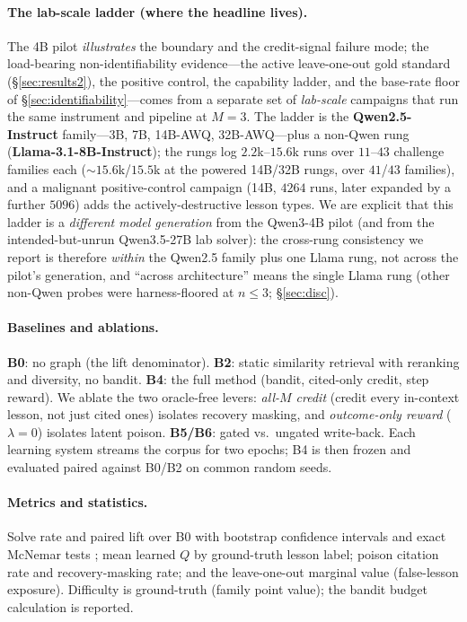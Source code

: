 \documentclass[10pt,twocolumn]{article}
\begin{document}
\paragraph{The lab-scale ladder (where the headline lives).} The 4B pilot
\emph{illustrates} the boundary and the credit-signal failure mode; the load-bearing
non-identifiability evidence---the active leave-one-out gold standard (\S\ref{sec:results2}),
the positive control, the capability ladder, and the base-rate floor of
\S\ref{sec:identifiability}---comes from a separate set of \emph{lab-scale} campaigns that
run the same instrument and pipeline at $M{=}3$. The ladder is the \textbf{Qwen2.5-Instruct}
family---3B, 7B, 14B-AWQ, 32B-AWQ---plus a non-Qwen rung
(\textbf{Llama-3.1-8B-Instruct}); the rungs log $2.2$k--$15.6$k runs over $11$--$43$
challenge families each (${\sim}15.6$k/$15.5$k at the powered 14B/32B rungs, over $41$/$43$
families), and a malignant positive-control campaign (14B, $4264$ runs, later expanded by a
further $5096$) adds the actively-destructive lesson types. We are explicit that this ladder is a \emph{different
model generation} from the Qwen3-4B pilot (and from the intended-but-unrun Qwen3.5-27B lab
solver): the cross-rung consistency we report is therefore \emph{within} the Qwen2.5 family
plus one Llama rung, not across the pilot's generation, and ``across architecture'' means
the single Llama rung (other non-Qwen probes were harness-floored at $n\le3$;
\S\ref{sec:disc}).

\paragraph{Baselines and ablations.} \textbf{B0}: no graph (the lift denominator).
\textbf{B2}: static similarity retrieval with reranking and diversity, no bandit.
\textbf{B4}: the full method (bandit, cited-only credit, step reward). We ablate
the two oracle-free levers: \emph{all-$M$ credit} (credit every in-context lesson,
not just cited ones) isolates recovery masking, and \emph{outcome-only reward}
($\lambda{=}0$) isolates latent poison. \textbf{B5/B6}: gated vs.\ ungated
write-back. Each learning system streams the corpus for two epochs; B4 is then
frozen and evaluated paired against B0/B2 on common random seeds.

\paragraph{Metrics and statistics.} Solve rate and paired lift over B0 with
bootstrap confidence intervals and exact McNemar tests
\citep{PairedBootstrap,ErrorBarsToEvals}; mean learned $Q$ by ground-truth lesson
label; poison citation rate and recovery-masking rate; and the leave-one-out
marginal value (false-lesson exposure). Difficulty is ground-truth (family point
value); the bandit budget calculation is reported.
\end{document}

